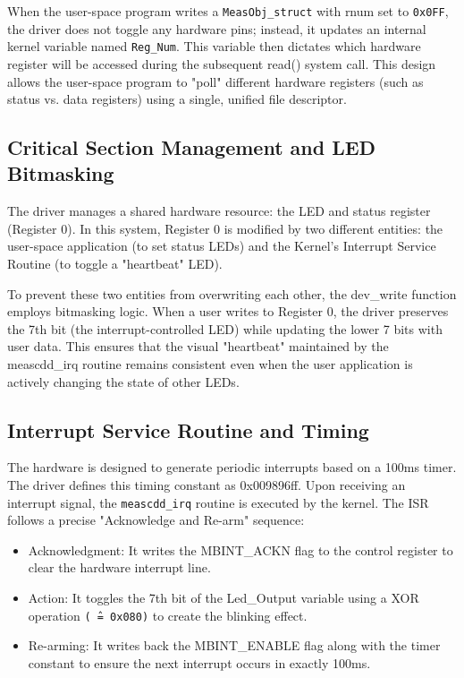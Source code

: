 When the user-space program writes a \texttt{MeasObj\_struct} with rnum set to \texttt{0x0FF}, the driver does not toggle any hardware pins; instead, it updates an internal kernel variable named \texttt{Reg\_Num}. This variable then dictates which hardware register will be accessed during the subsequent read() system call. This design allows the user-space program to "poll" different hardware registers (such as status vs. data registers) using a single, unified file descriptor.

\subsection{Critical Section Management and LED Bitmasking}
The driver manages a shared hardware resource: the LED and status register (Register 0). In this system, Register 0 is modified by two different entities: the user-space application (to set status LEDs) and the Kernel's Interrupt Service Routine (to toggle a "heartbeat" LED).

To prevent these two entities from overwriting each other, the dev\_write function employs bitmasking logic. When a user writes to Register 0, the driver preserves the 7th bit (the interrupt-controlled LED) while updating the lower 7 bits with user data. This ensures that the visual "heartbeat" maintained by the meascdd\_irq routine remains consistent even when the user application is actively changing the state of other LEDs.

\subsection{Interrupt Service Routine and Timing}
The hardware is designed to generate periodic interrupts based on a 100ms timer. The driver defines this timing constant as 0x009896ff. Upon receiving an interrupt signal, the \texttt{meascdd\_irq} routine is executed by the kernel.
The ISR follows a precise "Acknowledge and Re-arm" sequence:
\begin{itemize}
\item Acknowledgment: It writes the MBINT\_ACKN flag to the control register to clear the hardware interrupt line.
\item Action: It toggles the 7th bit of the Led\_Output variable using a XOR operation \texttt{(\^\ = 0x080)} to create the blinking effect.
\item Re-arming: It writes back the MBINT\_ENABLE flag along with the timer constant to ensure the next interrupt occurs in exactly 100ms.
\end{itemize}

